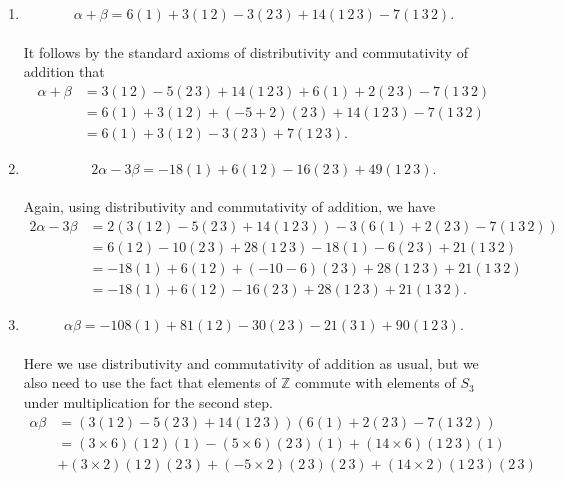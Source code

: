 \documentclass[12 pt, letterpaper]{hmcpset}
\begin{document}
\begin{solution}
	\begin{enumerate}
		\item
			\[
				\boxed{
					\alpha + \beta = 6 (1) + 3 (1 \, 2) - 3 (2 \, 3) + 14 (1 \, 2 \, 3) - 7 (1 \, 3 \, 2).
				}
			\] \\
			It follows by the standard axioms of distributivity and commutativity of addition that
			\[
				\begin{split}
					\alpha + \beta & = 3 (1 \, 2) - 5 (2 \, 3) + 14 (1 \, 2 \, 3) + 6 (1) + 2 (2 \, 3) - 7 (1 \, 3 \, 2) \\
						       & = 6 (1) + 3 (1 \, 2) + (-5 + 2)(2 \, 3) + 14 (1 \, 2 \, 3) - 7 (1 \, 3 \, 2) \\
						       & = 6 (1) + 3(1 \, 2) - 3(2 \, 3) + 7(1 \, 2 \, 3).
				\end{split}
			\]
		\item
			\[
				\boxed{
					2 \alpha - 3 \beta = -18 (1) + 6 (1 \, 2) - 16 (2 \, 3) + 49 (1 \, 2 \, 3).
				}
			\] \\
			Again, using distributivity and commutativity of addition, we have
			\[
				\begin{split}
					2 \alpha - 3 \beta & = 2(3 (1 \, 2) - 5 (2 \, 3) + 14 (1 \, 2 \, 3)) - 3(6 (1) + 2 (2 \, 3) - 7 (1 \, 3 \, 2)) \\
							   & = 6 (1 \, 2) - 10(2 \, 3) + 28 (1 \, 2 \, 3)- 18 (1) - 6(2 \, 3) + 21(1 \, 3 \, 2) \\
							   & = -18 (1) + 6 (1 \, 2) + (-10 - 6)(2 \, 3) + 28 (1 \, 2 \, 3) + 21 (1 \, 3 \, 2) \\
							   & = -18 (1) + 6(1 \, 2) -16 (2 \, 3) + 28 (1 \, 2 \, 3) + 21 (1 \, 3 \, 2).
				\end{split}
			\]
		\item
			\[
				\boxed{
					\alpha \beta = -108 (1) + 81 (1 \, 2) - 30 (2 \, 3) - 21 (3 \, 1) + 90 (1 \, 2 \, 3).
				}
			\] \\
			Here we use distributivity and commutativity of addition as usual, but we also need to use the fact that elements of $\mathbb{Z}$ commute with elements of $S_{3}$ under multiplication for the second step.
			\[
				\begin{split}
					\alpha \beta & = (3(1 \, 2) - 5 (2 \, 3) + 14(1 \, 2 \, 3))(6(1) + 2(2 \, 3) - 7(1 \, 3 \, 2)) \\
						     & = (3 \times 6) (1 \, 2) (1) - (5 \times 6) (2 \, 3) (1) + (14 \times 6)(1 \, 2 \, 3)(1) \\
						     & + (3 \times 2)(1 \, 2)(2 \, 3) + (-5 \times 2)(2 \, 3)(2 \, 3) + (14 \times 2)(1 \, 2 \, 3)(2 \, 3) \\

\end{split}\]
\end{enumerate}
\end{solution}
\end{document}
